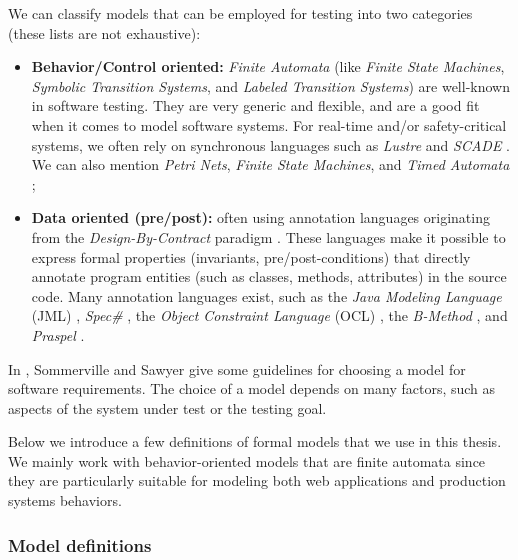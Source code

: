 We can classify models that can be employed for testing into two
categories (these lists are not exhaustive):

\begin{itemize}
    \item \textbf{Behavior/Control oriented:} \emph{Finite
        Automata} (like \emph{Finite State Machines},
        \emph{Symbolic Transition Systems}, and \emph{Labeled
        Transition Systems}) are well-known in software testing.
        They are very generic and flexible, and are a good fit
        when it comes to model software systems. For real-time
        and/or safety-critical systems, we often rely on
        synchronous languages such as \emph{Lustre}
        \cite{lustre:ieee} and \emph{SCADE}
        \cite{LeSergent:2011:SCF:2188575.2188578}. We can also
        mention \emph{Petri Nets}, \emph{Finite State Machines},
        and \emph{Timed Automata} \cite{Alur94atheory};

    \item \textbf{Data oriented (pre/post):} often using annotation
        languages originating from the \textit{Design-By-Contract}
        paradigm \cite{Meyer:1992:ADC:618974.619797}. These languages
        make it possible to express formal properties
        (invariants, pre/post-conditions) that directly annotate
        program entities (such as classes, methods, attributes)
        in the source code. Many annotation languages exist, such
        as the \emph{Java Modeling Language} (JML) \cite{jml},
        \emph{Spec\#} \cite{117852}, the \emph{Object Constraint
        Language} (OCL) \cite{Warmer:1998:OCL:291202}, the
        \emph{B-Method} \cite{Lano:1996:BLM:525749}, and
        \emph{Praspel} \cite{Enderlin:2011:PSL:2075545.2075551}.
\end{itemize}

In \cite{Sommerville:1997:REG:549198}, Sommerville and Sawyer
give some guidelines for choosing a model for software
requirements. The choice of a model depends on many factors, such
as aspects of the system under test or the testing goal.

Below we introduce a few definitions of formal models that we use
in this thesis. We mainly work with behavior-oriented models that
are finite automata since they are particularly suitable for
modeling both web applications and production systems behaviors.

\subsubsection{Model definitions}

